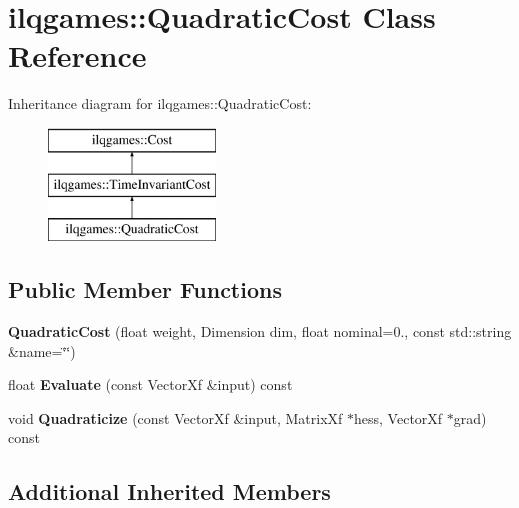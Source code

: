 \hypertarget{classilqgames_1_1_quadratic_cost}{}\section{ilqgames\+:\+:Quadratic\+Cost Class Reference}
\label{classilqgames_1_1_quadratic_cost}
Inheritance diagram for ilqgames\+:\+:Quadratic\+Cost\+:\begin{figure}[H]
\begin{center}
\leavevmode
\includegraphics[height=3.000000cm]{classilqgames_1_1_quadratic_cost}
\end{center}
\end{figure}
\subsection*{Public Member Functions}
\begin{DoxyCompactItemize}
\item 
{\bfseries Quadratic\+Cost} (float weight, Dimension dim, float nominal=0., const std\+::string \&name=\char`\"{}\char`\"{})\hypertarget{classilqgames_1_1_quadratic_cost_a808c59c5dc19b77da62a8463f38cf4b1}{}\label{classilqgames_1_1_quadratic_cost_a808c59c5dc19b77da62a8463f38cf4b1}

\item 
float {\bfseries Evaluate} (const Vector\+Xf \&input) const \hypertarget{classilqgames_1_1_quadratic_cost_a2f1b56afdb011f212e7958e43f5601bc}{}\label{classilqgames_1_1_quadratic_cost_a2f1b56afdb011f212e7958e43f5601bc}

\item 
void {\bfseries Quadraticize} (const Vector\+Xf \&input, Matrix\+Xf $\ast$hess, Vector\+Xf $\ast$grad) const \hypertarget{classilqgames_1_1_quadratic_cost_aedfd8f1352bf30b1f4bf90d63dc38ce9}{}\label{classilqgames_1_1_quadratic_cost_aedfd8f1352bf30b1f4bf90d63dc38ce9}

\end{DoxyCompactItemize}
\subsection*{Additional Inherited Members}


